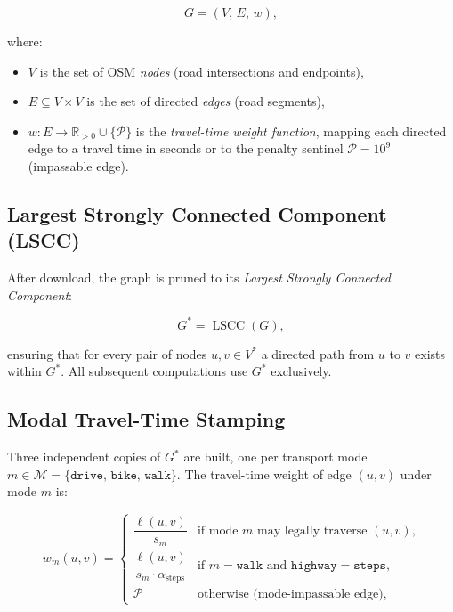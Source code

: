 \documentclass[12pt, a4paper]{article}
\theoremstyle{definition}
\begin{document}
\[
  G = (V,\, E,\, w),
\]

\noindent where:
\begin{itemize}
  \item $V$ is the set of OSM \emph{nodes} (road intersections and endpoints),
  \item $E \subseteq V \times V$ is the set of directed \emph{edges} (road
        segments),
  \item $w : E \to \mathbb{R}_{>0} \cup \{\mathcal{P}\}$ is the
        \emph{travel-time weight function}, mapping each directed edge to a
        travel time in seconds or to the penalty sentinel
        $\mathcal{P} = 10^9$ (impassable edge).
\end{itemize}

\subsection{Largest Strongly Connected Component (LSCC)}

After download, the graph is pruned to its \emph{Largest Strongly Connected
Component}:

\[
  G^* = \operatorname{LSCC}(G),
\]

\noindent ensuring that for every pair of nodes $u, v \in V^*$ a directed
path from $u$ to $v$ exists within $G^*$.  All subsequent computations use
$G^*$ exclusively.

\subsection{Modal Travel-Time Stamping}
\label{sec:modal}

Three independent copies of $G^*$ are built, one per transport mode
$m \in \mathcal{M} = \{\texttt{drive},\, \texttt{bike},\, \texttt{walk}\}$.
The travel-time weight of edge $(u, v)$ under mode $m$ is:

\begin{equation}
  \label{eq:travel_time}
  w_m(u,v) =
  \begin{cases}
    \dfrac{\ell(u,v)}{s_m}
      & \text{if mode $m$ may legally traverse $(u,v)$,} \\[8pt]
    \dfrac{\ell(u,v)}{s_m \cdot \alpha_{\text{steps}}}
      & \text{if } m = \texttt{walk} \text{ and } \texttt{highway} = \texttt{steps},\\[8pt]
    \mathcal{P}
      & \text{otherwise (mode-impassable edge),}
  \end{cases}
\end{equation}
\end{document}
